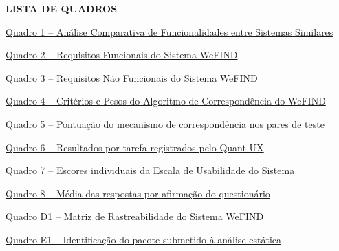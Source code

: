 \thispagestyle{empty}
\begin{center}
    \textbf{\large LISTA DE QUADROS}
\end{center}
\vspace{1.5cm}

\noindent \hyperlink{quadro:similares}{Quadro 1 -- Análise Comparativa de Funcionalidades entre Sistemas Similares \dotfill \pageref*{quadro:similares}}\par\vspace{0.25cm}
\noindent \hyperlink{quadro:funcionais}{Quadro 2 -- Requisitos Funcionais do Sistema WeFIND \dotfill \pageref*{quadro:funcionais}}\par\vspace{0.25cm}
\noindent \hyperlink{quadro:nao_funcionais}{Quadro 3 -- Requisitos Não Funcionais do Sistema WeFIND \dotfill \pageref*{quadro:nao_funcionais}}\par\vspace{0.25cm}
\noindent \hyperlink{quadro:matching}{Quadro 4 -- Critérios e Pesos do Algoritmo de Correspondência do WeFIND \dotfill \pageref*{quadro:matching}}\par\vspace{0.25cm}
\noindent \hyperlink{quadro:teste_correspondencia}{Quadro 5 -- Pontuação do mecanismo de correspondência nos pares de teste \dotfill \pageref*{quadro:teste_correspondencia}}\par\vspace{0.25cm}
\noindent \hyperlink{quadro:resultados_tarefas}{Quadro 6 -- Resultados por tarefa registrados pelo Quant UX \dotfill \pageref*{quadro:resultados_tarefas}}\par\vspace{0.25cm}
\noindent \hyperlink{quadro:escores_sus}{Quadro 7 -- Escores individuais da Escala de Usabilidade do Sistema \dotfill \pageref*{quadro:escores_sus}}\par\vspace{0.25cm}
\noindent \hyperlink{quadro:medias_itens_sus}{Quadro 8 -- Média das respostas por afirmação do questionário \dotfill \pageref*{quadro:medias_itens_sus}}\par\vspace{0.25cm}
\noindent \hyperlink{quadro:rastreabilidade}{Quadro D1 -- Matriz de Rastreabilidade do Sistema WeFIND \dotfill \pageref*{quadro:rastreabilidade}}\par\vspace{0.25cm}
\noindent \hyperlink{quadro:mobsf_pacote}{Quadro E1 -- Identificação do pacote submetido à análise estática \dotfill \pageref*{quadro:mobsf_pacote}}\par

\clearpage
